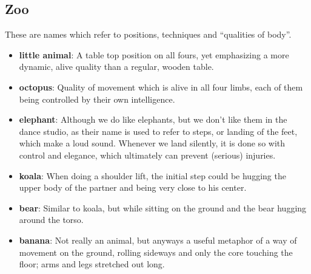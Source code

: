 \subsection{Zoo}\label{subsec:zoo}

These are names which refer to positions, techniques and ``qualities of body''.

\begin{itemize}
    \item \textbf{little animal}: A table top position on all fours, yet emphasizing a more dynamic, alive quality than a regular, wooden table.
    \item \textbf{octopus}: Quality of movement which is alive in all four limbs, each of them being controlled by their own intelligence.
    \item \textbf{elephant}: Although we do like elephants, but we don't like them in the dance studio, as their name is used to refer to steps, or landing of the feet, which make a loud sound.
    Whenever we land silently, it is done so with control and elegance, which ultimately can prevent (serious) injuries.
    \item \textbf{koala}: When doing a shoulder lift, the initial step could be hugging the upper body of the partner and being very close to his center.
    \item \textbf{bear}: Similar to koala, but while sitting on the ground and the bear hugging around the torso.
    \item \textbf{banana}: Not really an animal, but anyways a useful metaphor of a way of movement on the ground, rolling sideways and only the core touching the floor; arms and legs stretched out long.
\end{itemize}
